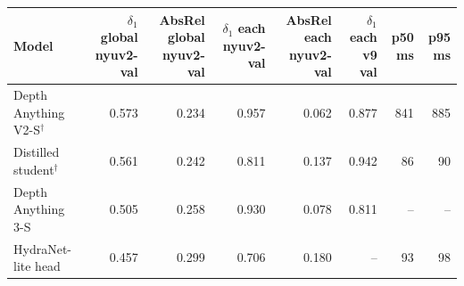 \begin{tabular}{@{}lrrrrrrr@{}}
\toprule
Model & $\delta_1$ global nyuv2-val & AbsRel global nyuv2-val & $\delta_1$ each nyuv2-val & AbsRel each nyuv2-val & $\delta_1$ each v9 val & p50 ms & p95 ms \\
\midrule
Depth Anything V2-S$^\dagger$ & 0.573 & 0.234 & 0.957 & 0.062 & 0.877 & 841 & 885 \\
Distilled student$^\dagger$ & 0.561 & 0.242 & 0.811 & 0.137 & 0.942 & 86 & 90 \\
Depth Anything 3-S & 0.505 & 0.258 & 0.930 & 0.078 & 0.811 & -- & -- \\
HydraNet-lite head & 0.457 & 0.299 & 0.706 & 0.180 & -- & 93 & 98 \\
\bottomrule
\end{tabular}
